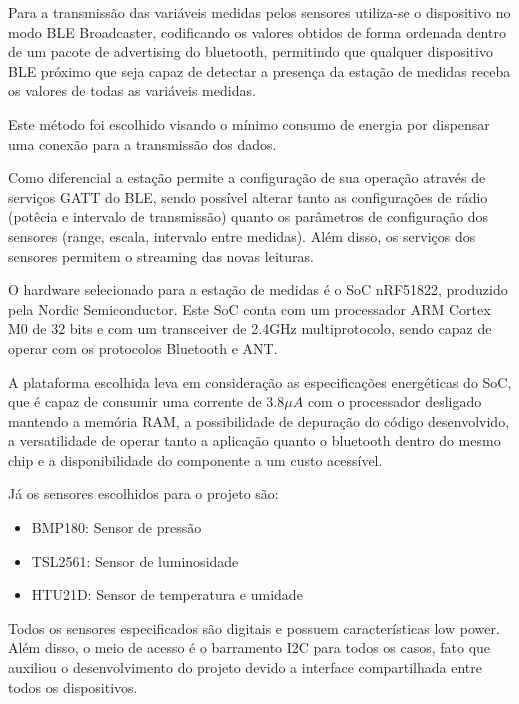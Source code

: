 Para a transmissão das variáveis medidas pelos sensores utiliza-se o dispositivo
no modo BLE Broadcaster, codificando os valores obtidos de forma ordenada dentro
de um pacote de advertising do bluetooth, permitindo que qualquer dispositivo
BLE próximo que seja capaz de detectar a presença da estação de medidas
receba os valores de todas as variáveis medidas.

Este método foi escolhido visando o mínimo consumo de energia por dispensar uma
conexão para a transmissão dos dados.
 
Como diferencial a estação permite a configuração de sua operação através de
serviços GATT do BLE, sendo possível alterar tanto as configurações de rádio
(potêcia e intervalo de transmissão) quanto os parâmetros de configuração dos
sensores (range, escala, intervalo entre medidas). Além disso, os serviços dos
sensores permitem o streaming das novas leituras.



O hardware selecionado para a estação de medidas é o SoC nRF51822, produzido
pela Nordic Semiconductor. Este SoC conta com um processador ARM Cortex M0 de 32
bits e com um transceiver de 2.4GHz multiprotocolo, sendo capaz de operar com
os protocolos Bluetooth e ANT.\cite{nRF51ProdSpec}

A plataforma escolhida leva em consideração as especificações energéticas do 
SoC, que é capaz de consumir uma corrente de 3.8$\mu A$ com o processador
desligado mantendo a memória RAM\cite{nRF51ProdSpec}, a possibilidade de
depuração do código desenvolvido, a versatilidade de operar tanto a aplicação
quanto o bluetooth dentro do mesmo chip e a disponibilidade do componente a um
custo acessível.

Já os sensores escolhidos para o projeto são:
\begin{itemize} 
  \item BMP180: Sensor de pressão
  \item TSL2561: Sensor de luminosidade 
  \item HTU21D: Sensor de temperatura e umidade
\end{itemize}

Todos os sensores especificados são digitais e possuem características low
power. Além disso, o meio de acesso é o barramento I2C para todos os casos, fato
que auxiliou o desenvolvimento do projeto devido a interface compartilhada entre
todos os dispositivos.

